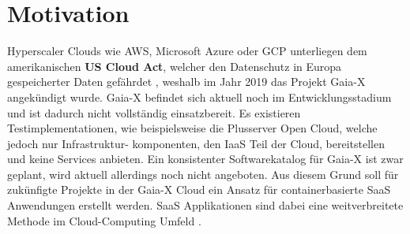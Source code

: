 \section{Motivation}
\label{sec:einleitung:motivation}
Hyperscaler Clouds wie \ac{AWS}, Microsoft Azure oder \ac{GCP} unterliegen dem amerikanischen \textbf{US Cloud Act}, welcher
den Datenschutz in Europa gespeicherter Daten gefährdet \cite{Kagermann2021}, weshalb im Jahr 2019 das Projekt Gaia-X angekündigt wurde.
Gaia-X befindet sich aktuell noch im Entwicklungsstadium und ist dadurch nicht vollständig einsatzbereit.
Es existieren Testimplementationen, wie beispielsweise die Plusserver Open Cloud, welche jedoch nur Infrastruktur-
komponenten, den \ac{IaaS} Teil der Cloud, bereitstellen und keine Services anbieten. Ein konsistenter Softwarekatalog für Gaia-X ist zwar geplant\cite{BMWi2019},
wird aktuell allerdings noch nicht angeboten. Aus diesem Grund soll für zukünfigte Projekte in der Gaia-X Cloud ein Ansatz
für containerbasierte \ac{SaaS} Anwendungen erstellt werden. 
\ac{SaaS} Applikationen sind dabei eine weitverbreitete Methode im Cloud-Computing Umfeld \cite{Schroeter2012}.